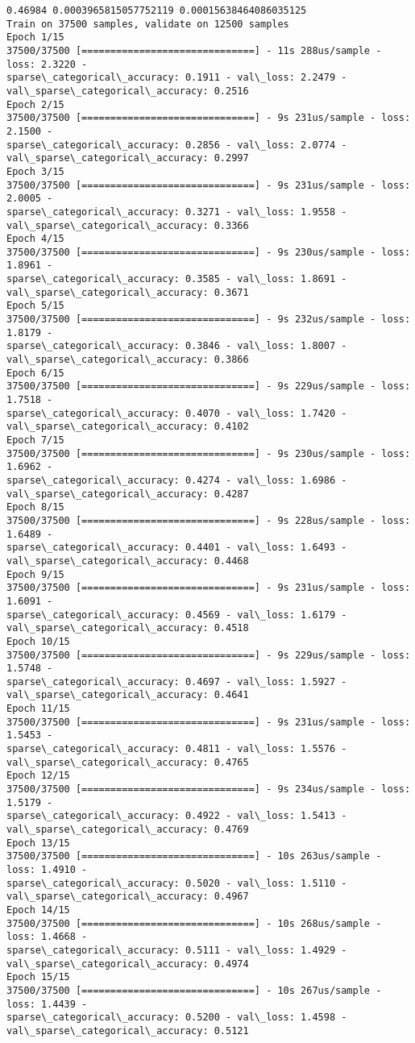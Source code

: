 \documentclass[11pt]{article}
\begin{document}
    \begin{Verbatim}[commandchars=\\\{\}]
0.46984 0.0003965815057752119 0.00015638464086035125
Train on 37500 samples, validate on 12500 samples
Epoch 1/15
37500/37500 [==============================] - 11s 288us/sample - loss: 2.3220 -
sparse\_categorical\_accuracy: 0.1911 - val\_loss: 2.2479 -
val\_sparse\_categorical\_accuracy: 0.2516
Epoch 2/15
37500/37500 [==============================] - 9s 231us/sample - loss: 2.1500 -
sparse\_categorical\_accuracy: 0.2856 - val\_loss: 2.0774 -
val\_sparse\_categorical\_accuracy: 0.2997
Epoch 3/15
37500/37500 [==============================] - 9s 231us/sample - loss: 2.0005 -
sparse\_categorical\_accuracy: 0.3271 - val\_loss: 1.9558 -
val\_sparse\_categorical\_accuracy: 0.3366
Epoch 4/15
37500/37500 [==============================] - 9s 230us/sample - loss: 1.8961 -
sparse\_categorical\_accuracy: 0.3585 - val\_loss: 1.8691 -
val\_sparse\_categorical\_accuracy: 0.3671
Epoch 5/15
37500/37500 [==============================] - 9s 232us/sample - loss: 1.8179 -
sparse\_categorical\_accuracy: 0.3846 - val\_loss: 1.8007 -
val\_sparse\_categorical\_accuracy: 0.3866
Epoch 6/15
37500/37500 [==============================] - 9s 229us/sample - loss: 1.7518 -
sparse\_categorical\_accuracy: 0.4070 - val\_loss: 1.7420 -
val\_sparse\_categorical\_accuracy: 0.4102
Epoch 7/15
37500/37500 [==============================] - 9s 230us/sample - loss: 1.6962 -
sparse\_categorical\_accuracy: 0.4274 - val\_loss: 1.6986 -
val\_sparse\_categorical\_accuracy: 0.4287
Epoch 8/15
37500/37500 [==============================] - 9s 228us/sample - loss: 1.6489 -
sparse\_categorical\_accuracy: 0.4401 - val\_loss: 1.6493 -
val\_sparse\_categorical\_accuracy: 0.4468
Epoch 9/15
37500/37500 [==============================] - 9s 231us/sample - loss: 1.6091 -
sparse\_categorical\_accuracy: 0.4569 - val\_loss: 1.6179 -
val\_sparse\_categorical\_accuracy: 0.4518
Epoch 10/15
37500/37500 [==============================] - 9s 229us/sample - loss: 1.5748 -
sparse\_categorical\_accuracy: 0.4697 - val\_loss: 1.5927 -
val\_sparse\_categorical\_accuracy: 0.4641
Epoch 11/15
37500/37500 [==============================] - 9s 231us/sample - loss: 1.5453 -
sparse\_categorical\_accuracy: 0.4811 - val\_loss: 1.5576 -
val\_sparse\_categorical\_accuracy: 0.4765
Epoch 12/15
37500/37500 [==============================] - 9s 234us/sample - loss: 1.5179 -
sparse\_categorical\_accuracy: 0.4922 - val\_loss: 1.5413 -
val\_sparse\_categorical\_accuracy: 0.4769
Epoch 13/15
37500/37500 [==============================] - 10s 263us/sample - loss: 1.4910 -
sparse\_categorical\_accuracy: 0.5020 - val\_loss: 1.5110 -
val\_sparse\_categorical\_accuracy: 0.4967
Epoch 14/15
37500/37500 [==============================] - 10s 268us/sample - loss: 1.4668 -
sparse\_categorical\_accuracy: 0.5111 - val\_loss: 1.4929 -
val\_sparse\_categorical\_accuracy: 0.4974
Epoch 15/15
37500/37500 [==============================] - 10s 267us/sample - loss: 1.4439 -
sparse\_categorical\_accuracy: 0.5200 - val\_loss: 1.4598 -
val\_sparse\_categorical\_accuracy: 0.5121
    \end{Verbatim}
\end{document}
